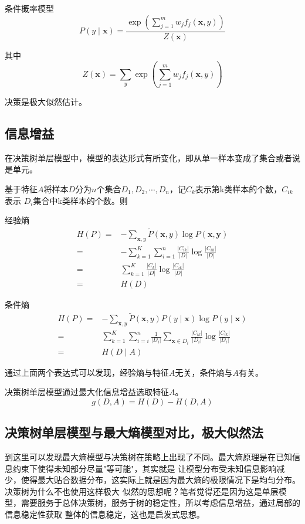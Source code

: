 \documentclass{article}
\begin{document}
        条件概率模型
        \[P(y\mid \boldsymbol{x})=\frac{\exp(\sum_{j=1}^{m}w_jf_j(\boldsymbol{x},y))}{Z(\boldsymbol{x})}\]

        其中
        \[Z(\boldsymbol{x})=\sum_{y}\exp(\sum_{j=1}^{m}w_jf_j(\boldsymbol{x},y))\]

        决策是极大似然估计。

        \subsection{信息增益}
        在决策树单层模型中，模型的表达形式有所变化，即从单一样本变成了集合或者说是单元。

        基于特征$A$将样本$D$分为$n$个集合$D_1,D_2,\cdots,D_n$，记$C_k$表示第k类样本的个数，$C_{ik}$表示
        $D_i$集合中k类样本的个数。则

        经验熵
        \begin{align*}
            H(P)=&-\sum_{\boldsymbol{x},y}\widetilde{P}(\boldsymbol{x},y)\log P(\boldsymbol{x,y})\\
                =&-\sum_{k=1}^{K}\sum_{i=1}^{n}\frac{\left|C_{ik}\right|}{\left|D\right|}\log \frac{\left|C_{ik}\right|}{\left|D\right|}\\
                =&\sum_{k=1}^{K}\frac{\left|C_{k}\right|}{\left|D\right|}\log \frac{\left|C_{ik}\right|}{\left|D\right|}\\
                =&H(D)
        \end{align*}

        条件熵
        \begin{align*}
            H(P)=&-\sum_{\boldsymbol{x},y}\widetilde{P}(\boldsymbol{x},y)P(y\mid\boldsymbol{x})\log P(y\mid\boldsymbol{x})\\
                =&\sum_{k=1}^{K}\sum_{i=i}^{n}\frac{1}{\left|D_i\right|}\sum_{\boldsymbol{x}\in D_i}\frac{\left|C_{ik}\right|}{\left|D_i\right|}\log \frac{\left|C_{ik}\right|}{\left|D_i\right|}\\
                =&H(D\mid A)
        \end{align*}

        通过上面两个表达式可以发现，经验熵与特征$A$无关，条件熵与$A$有关。

        决策树单层模型通过最大化信息增益选取特征$A$。
        \[g(D,A)=H(D)-H(D,A)\]

        \subsection{决策树单层模型与最大熵模型对比，极大似然法}
        到这里可以发现最大熵模型与决策树在策略上出现了不同。最大熵原理是在已知信息约束下使得未知部分尽量"等可能"，其实就是
        让模型分布受未知信息影响减少，使得最大贴合数据分布，这实际上就是因为最大熵的极限情况下是均匀分布。决策树为什么不也使用这样极大
        似然的思想呢？笔者觉得还是因为这是单层模型，需要服务于总体决策树，服务于树的稳定性，所以考虑信息增益，通过局部的信息稳定性获取
        整体的信息稳定，这也是启发式思想。
\end{document}

